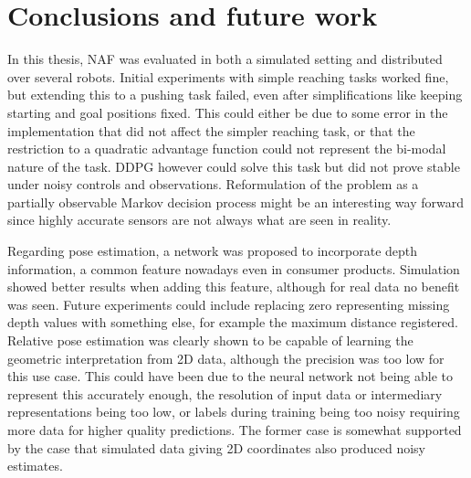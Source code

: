 \chapter{Conclusions and future work}

In this thesis, NAF was evaluated in both a simulated setting and distributed
over several robots. Initial experiments with simple reaching tasks worked
fine, but extending this to a pushing task failed, even after simplifications
like keeping starting and goal positions fixed. This could either be due to
some error in the implementation that did not affect the simpler reaching task,
or that the restriction to a quadratic advantage function could not represent
the bi-modal nature of the task. DDPG however could solve this task but did not
prove stable under noisy controls and observations. Reformulation of the
problem as a partially observable Markov decision process might be an
interesting way forward since highly accurate sensors are not always what are
seen in reality.

Regarding pose estimation, a network was proposed to incorporate depth
information, a common feature nowadays even in consumer products. Simulation
showed better results when adding this feature, although for real data no
benefit was seen. Future experiments could include replacing zero representing
missing depth values with something else, for example the maximum distance
registered. Relative pose estimation was clearly shown to be capable of
learning the geometric interpretation from 2D data, although the precision was
too low for this use case. This could have been due to the neural network not
being able to represent this accurately enough, the resolution of input data or
intermediary representations being too low, or labels during training being too
noisy requiring more data for higher quality predictions. The former case is
somewhat supported by the case that simulated data giving 2D coordinates also
produced noisy estimates.
